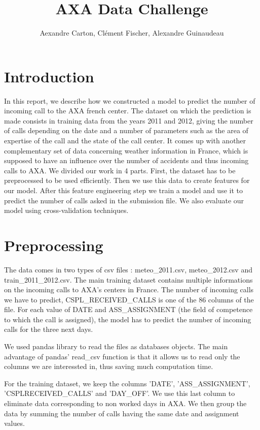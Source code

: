 \documentclass[english]{article}
\begin{document}
\title{AXA Data Challenge}


\author{Aexandre Carton, Clément Fischer, Alexandre Guinaudeau}

\maketitle

\section{Introduction}

In this report, we describe how we constructed a model to predict
the number of incoming call to the AXA french center. The dataset
on which the prediction is made consists in training data from the
years 2011 and 2012, giving the number of calls depending on the date
and a number of parameters such as the area of expertise of the call
and the state of the call center. It comes up with another complementary
set of data concerning weather information in France, which is supposed
to have an influence over the number of accidents and thus incoming
calls to AXA. We divided our work in 4 parts. First, the dataset has
to be preprocessed to be used efficiently. Then we use this data to
create features for our model. After this feature engineering step
we train a model and use it to predict the number of calls asked in
the submission file. We also evaluate our model using cross-validation
techniques.


\section{Preprocessing}

The data comes in two types of csv files : meteo\_2011.csv, meteo\_2012.csv
and train\_2011\_2012.csv. The main training dataset contains multiple
informations on the incoming calls to AXA's centers in France. The
number of incoming calls we have to predict, CSPL\_RECEIVED\_CALLS
is one of the 86 columns of the file. For each value of DATE and ASS\_ASSIGNMENT
(the field of competence to which the call is assigned), the model
has to predict the number of incoming calls for the three next days.

We used pandas library to read the files as databases objects. The
main advantage of pandas' read\_csv function is that it allows us
to read only the columns we are interessted in, thus saving much computation
time. 

For the training dataset, we keep the columns 'DATE', 'ASS\_ASSIGNMENT',
'CSPLRECEIVED\_CALLS' and 'DAY\_OFF'. We use this last column to eliminate
data corresponding to non worked days in AXA. We then group the data
by summing the number of calls having the same date and assignment
values. 
\end{document}
